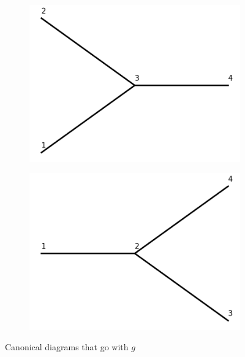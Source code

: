 \documentclass[11pt,a4paper,twoside,pdf]{article}
\numberwithin{equation}{section}
\begin{document}
\begin{figure}[h!]
    \centering
    \begin{subfigure}[t]{0.33\textwidth}
        \centering
        \includegraphics[width=\textwidth]{plots/1to2label.png}
        \caption{ }
        \label{fig:cannonical1_1}
    \end{subfigure}%
    \quad \raisebox{4.5\height}{\LARGE $+$}\quad
    \begin{subfigure}[t]{0.33\textwidth}
        \centering
        \includegraphics[width=\textwidth]{plots/2to1label.png}
        \caption{ }
        \label{fig:cannonical1_2}
    \end{subfigure}
    \caption{Canonical diagrams that go with $g$}
    \label{fig:cannonical1}
\end{figure}
\end{document}
